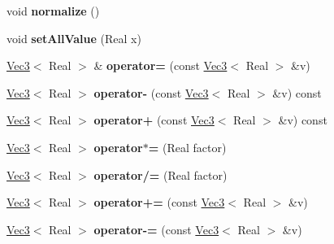 \begin{DoxyCompactItemize}
\item 
\hypertarget{classhokusai_1_1Vec3_acb8f86017b96bdc8ae1256b71a066873}{void {\bfseries normalize} ()}\label{classhokusai_1_1Vec3_acb8f86017b96bdc8ae1256b71a066873}

\item 
\hypertarget{classhokusai_1_1Vec3_afb03ca5d84a5d2e83702d951ae0ad7b9}{void {\bfseries set\+All\+Value} (Real x)}\label{classhokusai_1_1Vec3_afb03ca5d84a5d2e83702d951ae0ad7b9}

\item 
\hypertarget{classhokusai_1_1Vec3_a873a987828c07a131e98398a5fde47ee}{\hyperlink{classhokusai_1_1Vec3}{Vec3}$<$ Real $>$ \& {\bfseries operator=} (const \hyperlink{classhokusai_1_1Vec3}{Vec3}$<$ Real $>$ \&v)}\label{classhokusai_1_1Vec3_a873a987828c07a131e98398a5fde47ee}

\item 
\hypertarget{classhokusai_1_1Vec3_a187b8e07fb9d60ff9fc35cb04e18f95b}{\hyperlink{classhokusai_1_1Vec3}{Vec3}$<$ Real $>$ {\bfseries operator-\/} (const \hyperlink{classhokusai_1_1Vec3}{Vec3}$<$ Real $>$ \&v) const }\label{classhokusai_1_1Vec3_a187b8e07fb9d60ff9fc35cb04e18f95b}

\item 
\hypertarget{classhokusai_1_1Vec3_a08ce06cc98adfeee0f293ca9bdcca9eb}{\hyperlink{classhokusai_1_1Vec3}{Vec3}$<$ Real $>$ {\bfseries operator+} (const \hyperlink{classhokusai_1_1Vec3}{Vec3}$<$ Real $>$ \&v) const }\label{classhokusai_1_1Vec3_a08ce06cc98adfeee0f293ca9bdcca9eb}

\item 
\hypertarget{classhokusai_1_1Vec3_aa6d2ea495e6e2d12ebb92c6f88116310}{\hyperlink{classhokusai_1_1Vec3}{Vec3}$<$ Real $>$ {\bfseries operator$\ast$=} (Real factor)}\label{classhokusai_1_1Vec3_aa6d2ea495e6e2d12ebb92c6f88116310}

\item 
\hypertarget{classhokusai_1_1Vec3_a35a675003dd1252ffa3f8e7e1da00ac3}{\hyperlink{classhokusai_1_1Vec3}{Vec3}$<$ Real $>$ {\bfseries operator/=} (Real factor)}\label{classhokusai_1_1Vec3_a35a675003dd1252ffa3f8e7e1da00ac3}

\item 
\hypertarget{classhokusai_1_1Vec3_ab806573a85e395387d813739bdc6639a}{\hyperlink{classhokusai_1_1Vec3}{Vec3}$<$ Real $>$ {\bfseries operator+=} (const \hyperlink{classhokusai_1_1Vec3}{Vec3}$<$ Real $>$ \&v)}\label{classhokusai_1_1Vec3_ab806573a85e395387d813739bdc6639a}

\item 
\hypertarget{classhokusai_1_1Vec3_aef984f295f09ac7d141ec4474cdcc95c}{\hyperlink{classhokusai_1_1Vec3}{Vec3}$<$ Real $>$ {\bfseries operator-\/=} (const \hyperlink{classhokusai_1_1Vec3}{Vec3}$<$ Real $>$ \&v)}\label{classhokusai_1_1Vec3_aef984f295f09ac7d141ec4474cdcc95c}


\end{DoxyCompactItemize}
